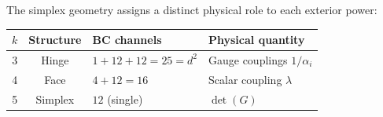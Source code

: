 \begin{remark}
The simplex geometry assigns a distinct physical role to each exterior power:
\begin{center}
\begin{tabular}{ccll}
\hline
$k$ & Structure & BC channels & Physical quantity \\
\hline
3 & Hinge & $1+12+12=25=d^2$ & Gauge couplings $1/\alpha_i$ \\
4 & Face  & $4+12=16$         & Scalar coupling $\lambda$ \\
5 & Simplex & $12$ (single)   & $\det(G)$ \\
\hline
\end{tabular}
\end{center}
\end{remark}
